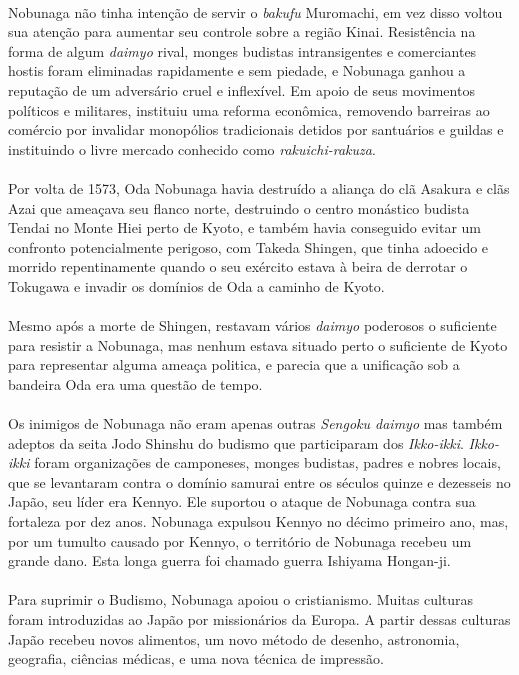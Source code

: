 \documentclass[12pt, a4paper]{article}
\begin{document}
            \\
            \indent Nobunaga não tinha intenção de servir o \textit{bakufu} Muromachi, em vez disso voltou sua atenção para aumentar seu controle sobre a região Kinai. Resistência na forma de algum \textit{daimyo} rival, monges budistas intransigentes e comerciantes hostis foram eliminadas rapidamente e sem piedade, e Nobunaga ganhou a reputação de um adversário cruel e inflexível. Em apoio de seus movimentos políticos e militares, instituiu uma reforma econômica, removendo barreiras ao comércio por invalidar monopólios tradicionais detidos por santuários e guildas e instituindo o livre mercado conhecido como \textit{rakuichi-rakuza}.\\
            \\
            \indent Por volta de 1573, Oda Nobunaga havia destruído a aliança do clã Asakura e clãs Azai que ameaçava seu flanco norte, destruindo o centro monástico budista Tendai no Monte Hiei perto de Kyoto, e também havia conseguido evitar um confronto potencialmente perigoso, com Takeda Shingen, que tinha adoecido e morrido repentinamente quando o seu exército estava à beira de derrotar o Tokugawa e invadir os domínios de Oda a caminho de Kyoto.\\
            \\
            \indent Mesmo após a morte de Shingen, restavam vários \textit{daimyo} poderosos o suficiente para resistir a Nobunaga, mas nenhum estava situado perto o suficiente de Kyoto para representar alguma ameaça politica, e parecia que a unificação sob a bandeira Oda era uma questão de tempo.\\
            \\
            \indent Os inimigos de Nobunaga não eram apenas outras \textit{Sengoku daimyo} mas também adeptos da seita Jodo Shinshu do budismo que participaram dos \textit{Ikko-ikki}. \textit{Ikko-ikki} foram organizações de camponeses, monges budistas, padres e nobres locais, que se levantaram contra o domínio samurai entre os séculos quinze e dezesseis no Japão, seu líder era Kennyo. Ele suportou o ataque de Nobunaga contra sua fortaleza por dez anos. Nobunaga expulsou Kennyo no décimo primeiro ano, mas, por um tumulto causado por Kennyo, o território de Nobunaga recebeu um grande dano. Esta longa guerra foi chamado guerra Ishiyama Hongan-ji.\\
            \\
            \indent Para suprimir o Budismo, Nobunaga apoiou o cristianismo. Muitas culturas foram introduzidas ao Japão por missionários da Europa. A partir dessas culturas Japão recebeu novos alimentos, um novo método de desenho, astronomia, geografia, ciências médicas, e uma nova técnica de impressão.\\
\end{document}
